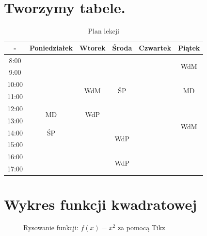 \documentclass[oneside, fleqn]{book}
\begin{document}
\section{Tworzymy tabele.}
\begin{table}[htbp]
\begin{tabular}{|c|c|c|c|c|c|}\hline

- & Poniedziałek & Wtorek & Środa & Czwartek & Piątek \\ \hline
8:00 & & & & & \multirow{2}{*}{WdM} \\ \cline{1-5}
9:00 & & & & & \\ \hline
10:00 & & \multirow{2}{*}{WdM} & \multirow{2}{*}{ŚP} & & \multirow{2}{*}{MD} \\ \cline{1-2} \cline{5-5}
11:00 & & & & & \\ \hline
12:00 & \multirow{2}{*}{MD} & \multirow{2}{*}{WdP} & & & \\ \cline{1-1} \cline{4-6}
13:00 & & & & & \multirow{2}{*}{WdM} \\ \cline{1-5}
14:00 & ŚP & & \multirow{2}{*}{WdP} & &  \\ \cline{1-3} \cline{5-6}
15:00 & & & & &  \\ \hline
16:00 & & & \multirow{2}{*}{WdP} & &  \\ \cline{1-3} \cline{5-6}
17:00 & & & & &  \\ \hline
\end{tabular}
\caption{Plan lekcji}
\end{table}

\newpage

\section{Wykres funkcji kwadratowej} 

\begin{figure}[htbp]
\caption{Rysowanie funkcji: $f(x)=x^2$ za pomocą Tikz}
\end{figure}
\end{document}
